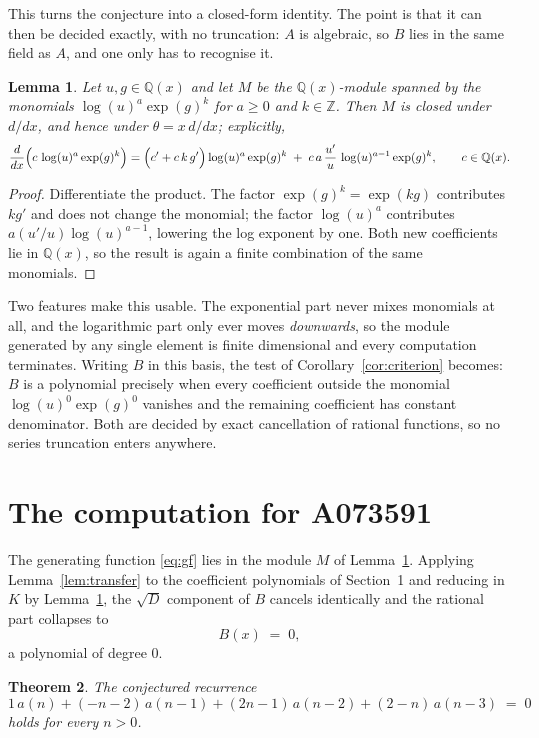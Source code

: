 \documentclass[11pt,a4paper]{article}
\theoremstyle{plain}
\newtheorem{theorem}{Theorem}
\newtheorem{lemma}[theorem]{Lemma}
\theoremstyle{definition}
\begin{document}
This turns the conjecture into a closed-form identity. The point is that it can then be
decided exactly, with no truncation: $A$ is algebraic, so $B$ lies in the same field as
$A$, and one only has to recognise it.

\begin{lemma}\label{lem:field}
Let $u,g\in\mathbb{Q}(x)$ and let $M$ be the $\mathbb{Q}(x)$-module spanned by the
monomials $\log(u)^{a}\exp(g)^{k}$ for $a\ge0$ and $k\in\mathbb{Z}$. Then $M$ is closed
under $d/dx$, and hence under $\theta=x\,d/dx$; explicitly,
\[
\frac{d}{dx}\Bigl(c\,\log(u)^{a}\exp(g)^{k}\Bigr)
=\Bigl(c'+c\,k\,g'\Bigr)\log(u)^{a}\exp(g)^{k}
\;+\;c\,a\,\frac{u'}{u}\,\log(u)^{a-1}\exp(g)^{k},
\qquad c\in\mathbb{Q}(x).
\]
\end{lemma}

\begin{proof}
Differentiate the product. The factor $\exp(g)^{k}=\exp(kg)$ contributes $kg'$ and does
not change the monomial; the factor $\log(u)^{a}$ contributes $a(u'/u)\log(u)^{a-1}$,
lowering the log exponent by one. Both new coefficients lie in $\mathbb{Q}(x)$, so the
result is again a finite combination of the same monomials.
\end{proof}

Two features make this usable. The exponential part never mixes monomials at all, and the
logarithmic part only ever moves \emph{downwards}, so the module generated by any single
element is finite dimensional and every computation terminates. Writing $B$ in this basis,
the test of Corollary~\ref{cor:criterion} becomes: $B$ is a polynomial precisely when every
coefficient outside the monomial $\log(u)^{0}\exp(g)^{0}$ vanishes and the remaining
coefficient has constant denominator. Both are decided by exact cancellation of rational
functions, so no series truncation enters anywhere.

\section{The computation for A073591}

The generating function \eqref{eq:gf} lies in the module $M$ of
Lemma~\ref{lem:field}.
Applying Lemma~\ref{lem:transfer} to the coefficient polynomials of Section~1 and reducing
in $K$ by Lemma~\ref{lem:field}, the $\sqrt{D}$ component of $B$ cancels identically and
the rational part collapses to
\[
B(x)\;=\;0 ,
\]
a polynomial of degree $0$.

\begin{theorem}
The conjectured recurrence
\[
1\,a(n) + (- n - 2)\,a(n-1) + (2 n - 1)\,a(n-2) + (2 - n)\,a(n-3) \;=\;0
\]
holds for every $n>0$.
\end{theorem}
\end{document}
